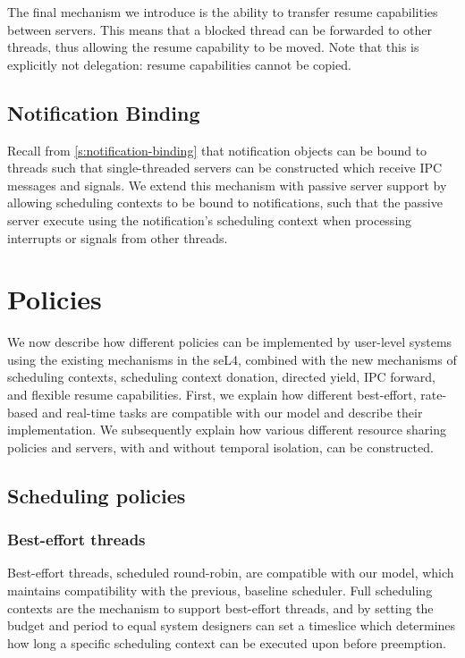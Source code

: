 The final mechanism we introduce is the ability to transfer resume capabilities between servers. 
This means that a blocked thread can be forwarded to other threads, thus allowing the resume
capability to be moved. Note that this is explicitly not delegation: resume capabilities cannot be
copied.

\subsection{Notification Binding}

Recall from \cref{s:notification-binding} that notification objects can be bound to threads such that single-threaded servers can be 
constructed which receive IPC messages and signals. We extend this mechanism with passive server
support by allowing scheduling contexts to be bound to notifications, such that the passive server
execute using the notification's scheduling context when processing interrupts or signals from other
threads. 

\section{Policies}
\label{sec:model-policies}

We now describe how different policies can be implemented by user-level systems using the 
existing mechanisms in the seL4, combined with the new mechanisms of scheduling contexts,
scheduling context donation, directed yield, IPC forward, and flexible resume capabilities.
First, we explain how different best-effort, rate-based and real-time tasks are compatible
with our model and describe their implementation. We subsequently explain how various different 
resource sharing policies and servers, with and without temporal isolation, can be constructed. 

\subsection{Scheduling policies}

\subsubsection{Best-effort threads}

Best-effort threads, scheduled round-robin, are compatible with our model, which maintains compatibility
with the previous, baseline \selfour scheduler. 
Full scheduling contexts are the mechanism to support best-effort threads, and by setting the budget and period to equal system designers can set a timeslice which determines how long a specific scheduling context
can be executed upon before preemption.

